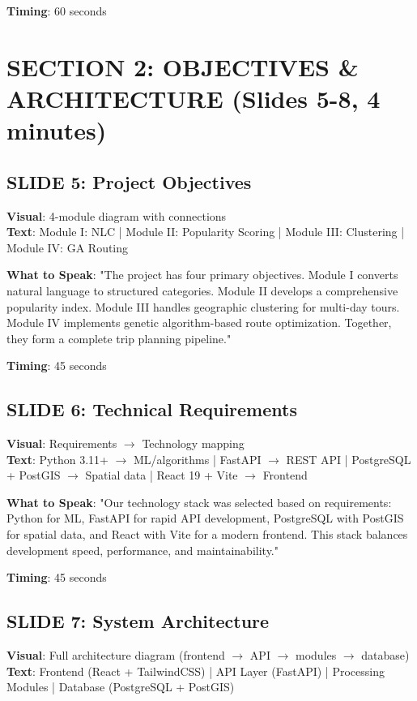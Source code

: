 \documentclass[12pt]{article}
\begin{document}
\textbf{Timing}: 60 seconds

\section{SECTION 2: OBJECTIVES \& ARCHITECTURE (Slides 5-8, 4 minutes)}

\subsection{SLIDE 5: Project Objectives}
\textbf{Visual}: 4-module diagram with connections \\
\textbf{Text}: Module I: NLC | Module II: Popularity Scoring | Module III: Clustering | Module IV: GA Routing

\textbf{What to Speak}:
"The project has four primary objectives. Module I converts natural language to structured categories. Module II develops a comprehensive popularity index. Module III handles geographic clustering for multi-day tours. Module IV implements genetic algorithm-based route optimization. Together, they form a complete trip planning pipeline."

\textbf{Timing}: 45 seconds

\subsection{SLIDE 6: Technical Requirements}
\textbf{Visual}: Requirements $\rightarrow$ Technology mapping \\
\textbf{Text}: Python 3.11+ $\rightarrow$ ML/algorithms | FastAPI $\rightarrow$ REST API | PostgreSQL + PostGIS $\rightarrow$ Spatial data | React 19 + Vite $\rightarrow$ Frontend

\textbf{What to Speak}:
"Our technology stack was selected based on requirements: Python for ML, FastAPI for rapid API development, PostgreSQL with PostGIS for spatial data, and React with Vite for a modern frontend. This stack balances development speed, performance, and maintainability."

\textbf{Timing}: 45 seconds

\subsection{SLIDE 7: System Architecture}
\textbf{Visual}: Full architecture diagram (frontend $\rightarrow$ API $\rightarrow$ modules $\rightarrow$ database) \\
\textbf{Text}: Frontend (React + TailwindCSS) | API Layer (FastAPI) | Processing Modules | Database (PostgreSQL + PostGIS)
\end{document}
